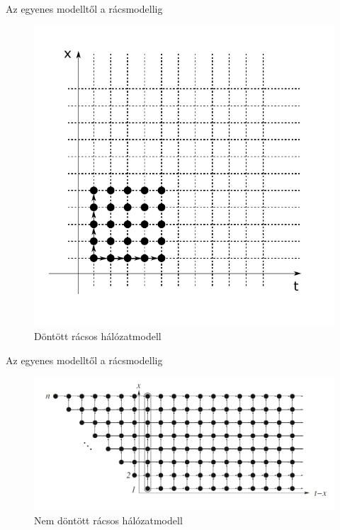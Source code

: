 \documentclass[10pt]{beamer}
\begin{document}
\begin{frame}{Az egyenes modelltől a rácsmodellig}
	\begin{figure}
		\centering \includegraphics[width=0.8\columnwidth]{Image/grid_network}
		\caption{\label{fig:grid_network}Döntött rácsos hálózatmodell \cite{even2016}}
	\end{figure}
\end{frame}

\begin{frame}{Az egyenes modelltől a rácsmodellig}
	\begin{figure}
		\centering \includegraphics[width=1\columnwidth]{Image/grid_network_untilted}
		\caption{\label{fig:grid_network_untilted}Nem döntött rácsos hálózatmodell \cite{even2016}}
	\end{figure}
\end{frame}
\end{document}
